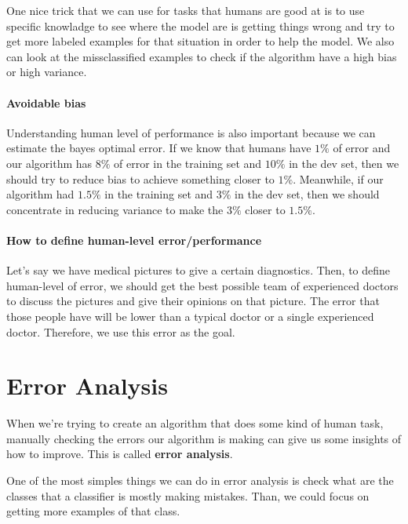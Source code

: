 \documentclass[12pt, a4paper, oneside]{book}
\begin{document}
One nice trick that we can use for tasks that humans are good at is to use
specific knowladge to see where the model are is getting things wrong and try to
get more labeled examples for that situation in order to help the model. We also
can look at the missclassified examples to check if the algorithm have a high
bias or high variance.

\paragraph{Avoidable bias}%
\label{par:avoidable_bias}

Understanding human level of performance is also important because we can
estimate the bayes optimal error. If we know that humans have $1\%$ of error and
our algorithm has $8\%$ of error in the training set and $10\%$ in the dev set,
then we should try to reduce bias to achieve something closer to $1\%$.
Meanwhile, if our algorithm had $1.5\%$ in the training set and $3\%$ in the dev
set, then we should concentrate in reducing variance to make the $3\%$ closer to
$1.5\%$.

\paragraph{How to define human-level error/performance}%
\label{par:how_to_define_human_level_error_performance}

Let's say we have medical pictures to give a certain diagnostics. Then, to
define human-level of error, we should get the best possible team of experienced
doctors to discuss the pictures and give their opinions on that picture. The
error that those people have will be lower than a typical doctor or a single
experienced doctor. Therefore, we use this error as the goal.

\section{Error Analysis}%
\label{sec:error_analysis}

When we're trying to create an algorithm that does some kind of human task,
manually checking the errors our algorithm is making can give us some insights
of how to improve. This is called \textbf{error analysis}.

One of the most simples things we can do in error analysis is check what are the
classes that a classifier is mostly making mistakes. Than, we could focus on
getting more examples of that class.
\end{document}
